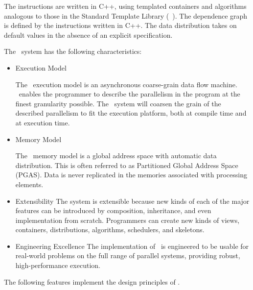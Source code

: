 \documentclass{report}
\begin{document}
The instructions are written in C++, using templated containers and algorithms
analogous to those in the Standard Template Library (\stl\ ).
The dependence graph is defined by the instructions written in C++.
The data distribution takes on default values
in the absence of an explicit specification.

The \stapl\ system has the following characteristics:

\begin{itemize}

\item Execution Model

The \stapl\ execution model is an asynchronous coarse-grain data flow machine.
\stapl\ enables the programmer to describe the parallelism in the program
at the finest granularity possible.  The \stapl\ system will coarsen the grain
of the described parallelism to fit the execution platform,
both at compile time and at execution time.

\item Memory Model

The \stapl\ memory model is a global address space with automatic data
distribution.  This is often referred to as Partitioned Global
Address Space (PGAS).  Data is never replicated in the memories associated
with processing elements.

\item Extensibility
\newline
The system is extensible because new kinds of each of the major features can
be introduced by composition, inheritance, and even implementation from scratch.
Programmers can create new kinds of views, containers, distributions,
algorithms, schedulers, and skeletons.

\item Engineering Excellence
\newline
The implementation of \stapl\ is engineered to be usable for real-world problems
on the full range of parallel systems, providing robust, high-performance
execution.
\end{itemize}

The following features implement the design principles of \stapl.
\end{document}
